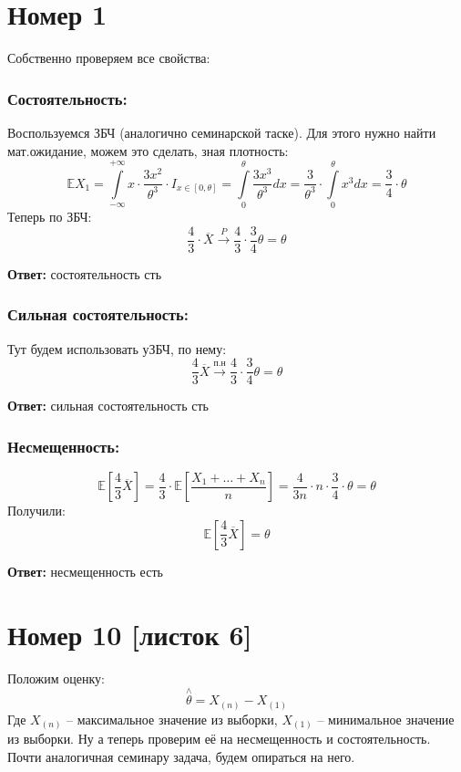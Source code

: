 \documentclass[a4paper,12pt]{article}
\author{Бурмашев Григорий, БПМИ-208}
\title{}
\date{\today}
\begin{document}
\section*{Номер 1}
Собственно проверяем все свойства:
\subsubsection*{Состоятельность:}
Воспользуемся ЗБЧ (аналогично семинарской таске). Для этого нужно найти мат.ожидание, можем это сделать, зная плотность:
\[
\mathbb{E} X_1 = \int\limits_{-\infty}^{+\infty} x \cdot \frac{3x^2}{\theta^3} \cdot I_{x \in [0, \theta]} = \int\limits_0^{\theta} \frac{3x^3}{\theta^3} dx =
\frac{3}{\theta^3}
\cdot 
\int\limits_0^{\theta} x^3  dx
=
\frac{3}{4} \cdot \theta 
 \]
Теперь по ЗБЧ:
\[
\frac{4}{3} \cdot \overline{X} \overset{P}{\longrightarrow} \frac{4}{3} \cdot \frac{3}{4} \theta = \theta
\]
\begin{center}
\textbf{Ответ: } состоятельность сть
\end{center}
\subsubsection*{Сильная состоятельность:}
Тут будем использовать уЗБЧ, по нему:
\[
\frac{4}{3} \overline{X} \overset{\text{п.н}}{\longrightarrow} \frac{4}{3} \cdot \frac{3}{4} \theta  = \theta 
\]
\begin{center}
\textbf{Ответ: } сильная состоятельность сть
\end{center}
\subsubsection*{Несмещенность:}
\[
\mathbb{E} \left[ \frac{4}{3} \overline{X} \right]  = \frac{4}{3} \cdot \mathbb{E} \left[
\frac{X_1 + \ldots + X_n}{n}
\right] = \frac{4}{3n} \cdot n \cdot \frac{3}{4} \cdot \theta = \theta
\]
Получили:
\[
\mathbb{E} \left[ \frac{4}{3} \overline{X} \right]   = \theta
\]
\begin{center}
\textbf{Ответ: } несмещенность есть
\end{center}
\clearpage
\section*{Номер 10 [листок 6]}
Положим оценку:
\[
\stackrel{\wedge}{\theta} = X_{(n)} - X_{(1)}
\]
Где $X_{(n)} $ -- максимальное значение из выборки, $X_{(1)}$ -- минимальное значение из выборки. 
Ну а теперь проверим её на несмещенность и состоятельность. Почти аналогичная семинару задача, будем опираться на него.
\end{document}
